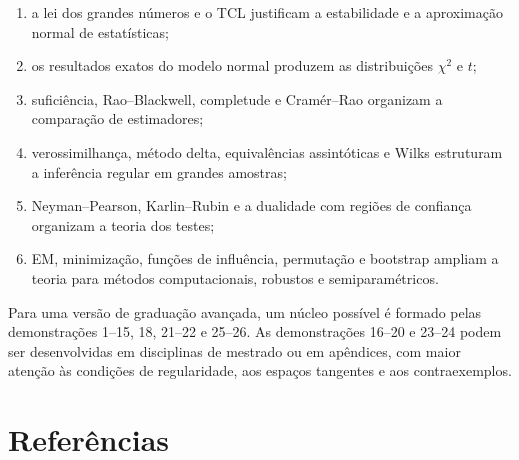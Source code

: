 \documentclass[
  letterpaper,
  DIV=11,
  numbers=noendperiod]{scrreprt}
\providecommand{\tightlist}{%
  \setlength{\itemsep}{0pt}\setlength{\parskip}{0pt}}\usepackage{longtable,booktabs,array}
\begin{document}
\begin{enumerate}
\def\labelenumi{\arabic{enumi}.}
\tightlist
\item
  a lei dos grandes números e o TCL justificam a estabilidade e a
  aproximação normal de estatísticas;
\item
  os resultados exatos do modelo normal produzem as distribuições
  \(\chi^2\) e \(t\);
\item
  suficiência, Rao--Blackwell, completude e Cramér--Rao organizam a
  comparação de estimadores;
\item
  verossimilhança, método delta, equivalências assintóticas e Wilks
  estruturam a inferência regular em grandes amostras;
\item
  Neyman--Pearson, Karlin--Rubin e a dualidade com regiões de confiança
  organizam a teoria dos testes;
\item
  EM, minimização, funções de influência, permutação e bootstrap ampliam
  a teoria para métodos computacionais, robustos e semiparamétricos.
\end{enumerate}

\begin{tcolorbox}[enhanced jigsaw, colback=white, leftrule=.75mm, colbacktitle=quarto-callout-important-color!10!white, breakable, titlerule=0mm, bottomtitle=1mm, title=\textcolor{quarto-callout-important-color}{\faExclamation}\hspace{0.5em}{Observação editorial}, colframe=quarto-callout-important-color-frame, toprule=.15mm, opacityback=0, bottomrule=.15mm, opacitybacktitle=0.6, arc=.35mm, toptitle=1mm, rightrule=.15mm, coltitle=black, left=2mm]

Para uma versão de graduação avançada, um núcleo possível é formado
pelas demonstrações 1--15, 18, 21--22 e 25--26. As demonstrações 16--20
e 23--24 podem ser desenvolvidas em disciplinas de mestrado ou em
apêndices, com maior atenção às condições de regularidade, aos espaços
tangentes e aos contraexemplos.

\end{tcolorbox}


\chapter*{Referências}\label{referuxeancias-7}

\end{document}
